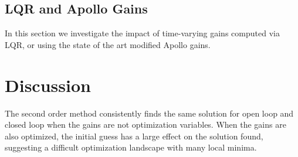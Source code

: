 \documentclass[letterpaper, paper,11pt]{AAS}
\begin{document}

\subsection{LQR and Apollo Gains}
In this section we investigate the impact of time-varying gains computed via LQR, or using the state of the art modified Apollo gains. 

\section{Discussion}
The second order method consistently finds the same solution for open loop and closed loop when the gains are not optimization variables. When the gains are also optimized, the initial guess has a large effect on the solution found, suggesting a difficult optimization landscape with many local minima. 



\end{document}
